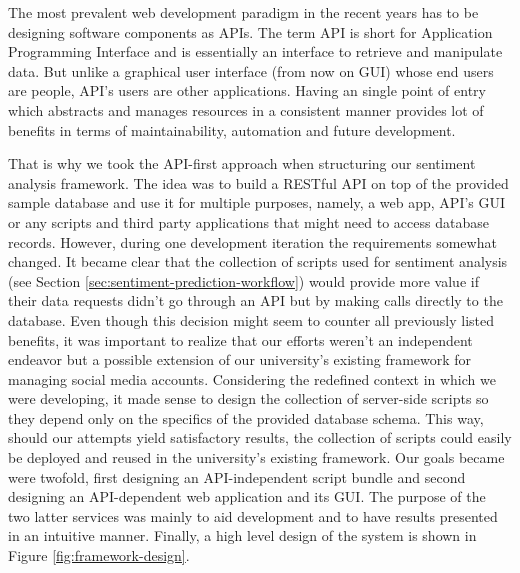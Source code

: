 The most prevalent web development paradigm in the recent years has to be designing software components as APIs. 
The term API is short for Application Programming Interface and is essentially an interface to retrieve and manipulate data. But unlike a graphical user interface (from now on GUI) whose end users are people, API's users are other applications. 
Having an single point of entry which abstracts and manages resources in a consistent manner provides lot of benefits in terms of maintainability, automation and future development.

That is why we took the API-first approach when structuring our sentiment analysis framework. 
The idea was to build a RESTful API on top of the provided sample database and use it for multiple purposes, namely, a web app, API's GUI or any scripts and third party applications that might need to access database records. 
However, during one development iteration the requirements somewhat changed.
It became clear that the collection of scripts used for sentiment analysis (see Section \ref{sec:sentiment-prediction-workflow}) would provide more value if their data requests didn't go through an API but by making calls directly to the database. 
Even though this decision might seem to counter all previously listed benefits, it was important to realize that our efforts weren't an independent endeavor but a possible extension of our university's existing framework for managing social media accounts. 
Considering the redefined context in which we were developing, it made sense to design the collection of server-side scripts so they depend only on the specifics of the provided database schema.
This way, should our attempts yield satisfactory results, the collection of scripts could easily be deployed and reused in the university's existing framework. 
Our goals became were twofold, first designing an API-independent script bundle and second designing an API-dependent web application and its GUI. 
The purpose of the two latter services was mainly to aid development and to have results presented in an intuitive manner.
Finally, a high level design of the system is shown in Figure \ref{fig:framework-design}.

